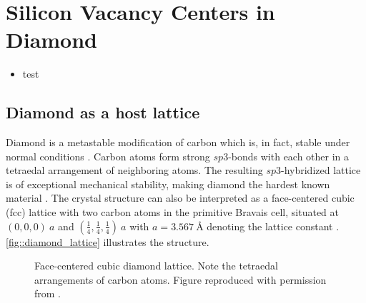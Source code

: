 
\chapter{Silicon Vacancy Centers in Diamond}	\label{ch::sivs}

\begin{remark}
    \begin{itemize}
      \item test
    \end{itemize}
\end{remark}

\section{Diamond as a host lattice}

  Diamond is a metastable modification of carbon which is, in fact, stable under normal conditions \cite{steinmetz::52}. Carbon atoms form strong $sp3$-bonds with each other in a tetraedal arrangement of neighboring atoms. The resulting $sp3$-hybridized lattice is of exceptional mechanical stability, making diamond the hardest known material \cite{?}. The crystal structure can also be interpreted as a face-centered cubic (fcc) lattice with two carbon atoms in the primitive Bravais cell, situated at $(0,0,0) \ a$ and $ (\frac{1}{4}, \frac{1}{4}, \frac{1}{4}) \ a$ with $a = \SI{3.567}{\angstrom}$ denoting the lattice constant \cite{steinmetz::56}. \autoref{fig::diamond_lattice} illustrates the structure.

  \begin{figure}[htp]
		\centering
		\caption[Face-centered cubic diamond lattice]{Face-centered cubic diamond lattice. Note the tetraedal arrangements of carbon atoms. Figure reproduced with permission from \cite{janine::thesis}.}
		\label{fig::diamond_lattice}
	\end{figure}

